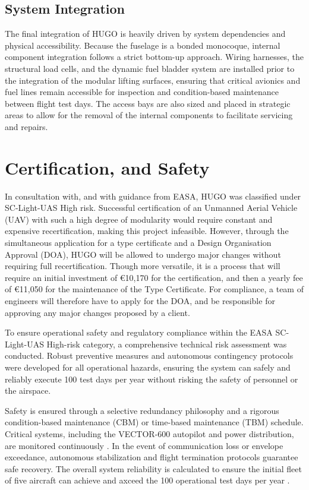 \subsection*{System Integration}
\label{subsec:exec-system_integration}
The final integration of HUGO is heavily driven by system dependencies and physical accessibility. Because the fuselage is a bonded monocoque, internal component integration follows a strict bottom-up approach. Wiring harnesses, the structural load cells, and the dynamic fuel bladder system are installed prior to the integration of the modular lifting surfaces, ensuring that critical avionics and fuel lines remain accessible for inspection and condition-based maintenance between flight test days. The access bays are also sized and placed in strategic areas to allow for the removal of the internal components to facilitate servicing and repairs.


\section*{Certification, and Safety}
\label{sec:exec-certification_and_safet}

In consultation with, and with guidance from EASA, HUGO was classified under SC-Light-UAS High risk. Successful certification of an Unmanned Aerial Vehicle (UAV) with such a high degree of modularity would require constant and expensive recertification, making this project infeasible. However, through the simultaneous application for a type certificate and a Design Organisation Approval (DOA), HUGO will be allowed to undergo major changes without requiring full recertification. Though more versatile, it is a process that will require an initial investment of \euro{10,170} for the certification, and then a yearly fee of \euro{11,050} for the maintenance of the Type Certificate. For compliance, a team of engineers will therefore have to apply for the DOA, and be responsible for approving any major changes proposed by a client.

To ensure operational safety and regulatory compliance within the EASA SC-Light-UAS High-risk category, a comprehensive technical risk assessment was conducted. Robust preventive measures and autonomous contingency protocols were developed for all operational hazards, ensuring the system can safely and reliably execute 100 test days per year without risking the safety of personnel or the airspace.

Safety is ensured through a selective redundancy philosophy and a rigorous condition-based maintenance (CBM) or time-based maintenance (TBM) schedule. Critical systems, including the VECTOR-600 autopilot and power distribution, are monitored continuously \cite{Imani2022}. In the event of communication loss or envelope exceedance, autonomous stabilization and flight termination protocols guarantee safe recovery. The overall system reliability is calculated to ensure the initial fleet of five aircraft can achieve and axceed the 100 operational test days per year \cite{Mencik2016, Lanzafame2024}.



